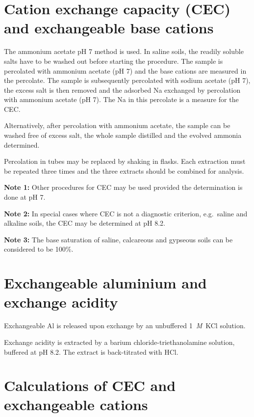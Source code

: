 \documentclass[
  letterpaper,
  DIV=11,
  numbers=noendperiod]{scrreprt}
\begin{document}
\hypertarget{cation-exchange-capacity-cec-and-exchangeable-base-cations}{%
\section{Cation exchange capacity (CEC) and exchangeable base
cations}\label{cation-exchange-capacity-cec-and-exchangeable-base-cations}}

The ammonium acetate pH 7 method is used. In saline soils, the readily
soluble salts have to be washed out before starting the procedure. The
sample is percolated with ammonium acetate (pH 7) and the base cations
are measured in the percolate. The sample is subsequently percolated
with sodium acetate (pH 7), the excess salt is then removed and the
adsorbed Na exchanged by percolation with ammonium acetate (pH 7). The
Na in this percolate is a measure for the CEC.

Alternatively, after percolation with ammonium acetate, the sample can
be washed free of excess salt, the whole sample distilled and the
evolved ammonia determined.

Percolation in tubes may be replaced by shaking in flasks. Each
extraction must be repeated three times and the three extracts should be
combined for analysis.

\textbf{Note 1:} Other procedures for CEC may be used provided the
determination is done at pH 7.

\textbf{Note 2:} In special cases where CEC is not a diagnostic
criterion, e.g.~saline and alkaline soils, the CEC may be determined at
pH 8.2.

\textbf{Note 3:} The base saturation of saline, calcareous and gypseous
soils can be considered to be 100\%.

\hypertarget{exchangeable-aluminium-and-exchange-acidity}{%
\section{Exchangeable aluminium and exchange
acidity}\label{exchangeable-aluminium-and-exchange-acidity}}

Exchangeable Al is released upon exchange by an unbuffered
1~\emph{M}~KCl solution.

Exchange acidity is extracted by a barium chloride-triethanolamine
solution, buffered at pH 8.2. The extract is back-titrated with HCl.

\hypertarget{calculations-of-cec-and-exchangeable-cations}{%
\section{Calculations of CEC and exchangeable
cations}\label{calculations-of-cec-and-exchangeable-cations}}
\end{document}
